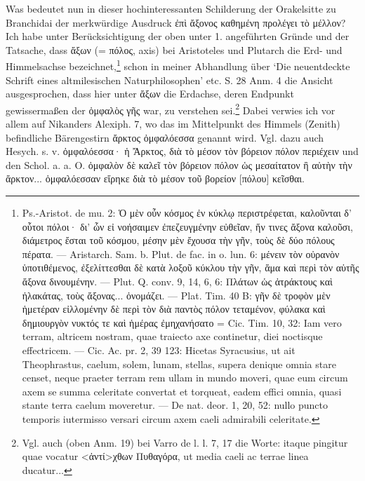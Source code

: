 \documentclass[a4paper, 11pt, oneside]{article}
\begin{document}
Was bedeutet nun in dieser hochinteressanten Schilderung der Orakelsitte zu Branchidai der merkwürdige Ausdruck ἐπὶ ἄξονος καθημένη προλέγει τὸ μέλλον? Ich habe unter Berücksichtigung der oben unter 1. angeführten Gründe und der Tatsache, dass ἄξων (= πόλος, axis) bei Aristoteles und Plutarch die Erd- und Himmelsachse bezeichnet,\footnote{Ps.-Aristot. de mu. 2: Ὁ μὲν οὖν κόσμος ἐν κύκλῳ περιστρέφεται, καλοῦνται δ' οὗτοι πόλοι· δι' ὧν εἰ νοήσαιμεν ἐπεζευγμένην εὐθεῖαν, ἥν τινες ἄξονα καλοῦσι, διάμετρος ἔσται τοῦ κόσμου, μέσην μὲν ἔχουσα τὴν γῆν, τοὺς δὲ δύο πόλους πέρατα. --- Aristarch. Sam. b. Plut. de fac. in o. lun. 6: μένειν τὸν οὐρανὸν ὑποτιθέμενος, ἐξελίττεσθαι δὲ κατὰ λοξοῦ κύκλου τὴν γῆν, ἅμα καὶ περὶ τὸν αὑτῆς ἄξονα δινουμένην. --- Plut. Q. conv. 9, 14, 6, 6: Πλάτων ὡς ἀτράκτους καὶ ἠλακάτας, τοὺς ἄξονας... ὀνομάζει. --- Plat. Tim. 40 B: γῆν δὲ τροφὸν μὲν ἡμετέραν εἰλλομένην δὲ περὶ τὸν διὰ παντὸς πόλον τεταμένον, φύλακα καὶ δημιουργὸν νυκτός τε καὶ ἡμέρας ἐμηχανήσατο = Cic. Tim. 10, 32: Iam vero terram, altricem nostram, quae traiecto axe continetur, diei noctisque effectricem. --- Cic. Ac. pr. 2, 39 123: Hicetas Syracusius, ut ait Theophrastus, caelum, solem, lunam, stellas, supera denique omnia stare censet, neque praeter terram rem ullam in mundo moveri, quae eum circum axem se summa celeritate convertat et torqueat, eadem effici omnia, quasi stante terra caelum moveretur. --- De nat. deor. 1, 20, 52: nullo puncto temporis iutermisso versari circum axem caeli admirabili celeritate.} schon in meiner Abhandlung über `Die neuentdeckte Schrift eines altmilesischen Naturphilosophen' etc. S. 28 Anm. 4 die Ansicht ausgesprochen, dass hier unter ἄξων die Erdachse, deren Endpunkt gewissermaßen der ὀμφαλὸς γῆς war, zu verstehen sei.\footnote{Vgl. auch (oben Anm. 19) bei Varro de l. l. 7, 17 die Worte: itaque pingitur quae vocatur <ἀντί>χθων Πυθαγόρα, ut media caeli ac terrae linea ducatur...} Dabei verwies ich vor allem auf Nikanders Alexiph. 7, wo das im Mittelpunkt des Himmels (Zenith) befindliche Bärengestirn ἄρκτος ὀμφαλόεσσα genannt wird. Vgl. dazu auch Hesych. s. v. ὀμφαλόεσσα· ἡ Ἄρκτος, διὰ τὸ μέσον τὸν βόρειον πόλον περιέχειν und den Schol. a. a. O. ὀμφαλὸν δὲ καλεῖ τὸν βόρειον πόλον ὡς μεσαίτατον ἢ αὐτὴν τὴν ἄρκτον... ὁμφαλόεσσαν εἴρηκε διὰ τὸ μέσον τοῦ βορείον [πόλου] κεῖσθαι.
\end{document}
